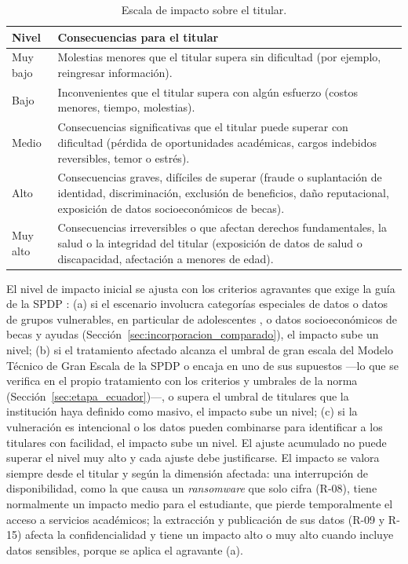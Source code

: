 \begin{table}[htbp]
  \centering
  \caption{Escala de impacto sobre el titular.}
  \label{tab:escala_impacto}
  \small
  \renewcommand{\arraystretch}{1.2}
  \begin{tabularx}{\textwidth}{|p{2.2cm}|L|}
    \hline
    \textbf{Nivel} & \textbf{Consecuencias para el titular} \\
    \hline
    Muy bajo & Molestias menores que el titular supera sin dificultad (por ejemplo, reingresar información). \\
    \hline
    Bajo & Inconvenientes que el titular supera con algún esfuerzo (costos menores, tiempo, molestias). \\
    \hline
    Medio & Consecuencias significativas que el titular puede superar con dificultad (pérdida de oportunidades académicas, cargos indebidos reversibles, temor o estrés). \\
    \hline
    Alto & Consecuencias graves, difíciles de superar (fraude o suplantación de identidad, discriminación, exclusión de beneficios, daño reputacional, exposición de datos socioeconómicos de becas). \\
    \hline
    Muy alto & Consecuencias irreversibles o que afectan derechos fundamentales, la salud o la integridad del titular (exposición de datos de salud o discapacidad, afectación a menores de edad). \\
    \hline
  \end{tabularx}
  \raggedright
\end{table}

El nivel de impacto inicial se ajusta con los criterios agravantes que exige la guía de la SPDP \cite{spdp2026guiav2}: (a) si el escenario involucra categorías especiales de datos o datos de grupos vulnerables, en particular de adolescentes \cite[art.~25]{lopdp2021}, o datos socioeconómicos de becas y ayudas (Sección~\ref{sec:incorporacion_comparado}), el impacto sube un nivel; (b) si el tratamiento afectado alcanza el umbral de gran escala del Modelo Técnico de Gran Escala de la SPDP o encaja en uno de sus supuestos \cite{spdp2026granescala} ---lo que se verifica en el propio tratamiento con los criterios y umbrales de la norma (Sección~\ref{sec:etapa_ecuador})---, o supera el umbral de titulares que la institución haya definido como masivo, el impacto sube un nivel; (c) si la vulneración es intencional o los datos pueden combinarse para identificar a los titulares con facilidad, el impacto sube un nivel. El ajuste acumulado no puede superar el nivel muy alto y cada ajuste debe justificarse. El impacto se valora siempre desde el titular y según la dimensión afectada: una interrupción de disponibilidad, como la que causa un \textit{ransomware} que solo cifra (R-08), tiene normalmente un impacto medio para el estudiante, que pierde temporalmente el acceso a servicios académicos; la extracción y publicación de sus datos (R-09 y R-15) afecta la confidencialidad y tiene un impacto alto o muy alto cuando incluye datos sensibles, porque se aplica el agravante (a).

